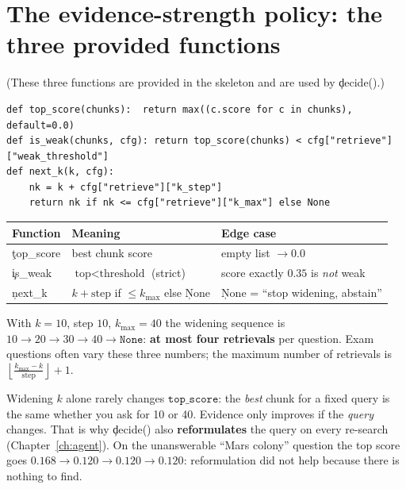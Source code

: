 \section{The evidence-strength policy: the three provided functions}
(These three functions are provided in the skeleton and are used by \c{decide()}.)
\begin{lstlisting}
def top_score(chunks):  return max((c.score for c in chunks), default=0.0)
def is_weak(chunks, cfg): return top_score(chunks) < cfg["retrieve"]["weak_threshold"]
def next_k(k, cfg):
    nk = k + cfg["retrieve"]["k_step"]
    return nk if nk <= cfg["retrieve"]["k_max"] else None
\end{lstlisting}
\begin{center}\begin{tabular}{@{}lll@{}}\toprule Function & Meaning & Edge case \\ \midrule
\c{top\_score} & best chunk score & empty list $\to 0.0$ \\
\c{is\_weak} & $\text{top}<\text{threshold}$ (strict) & score exactly $0.35$ is \emph{not} weak \\
\c{next\_k} & $k+\text{step}$ if $\le k_{\max}$ else \c{None} & \c{None} = ``stop widening, abstain'' \\
\bottomrule\end{tabular}\end{center}
\begin{keyidea}
With $k=10$, step $10$, $k_{\max}=40$ the widening sequence is $10\to20\to30\to40\to\texttt{None}$: \textbf{at most four retrievals} per question. Exam questions often vary these three numbers; the maximum number of retrievals is $\left\lfloor \frac{k_{\max}-k}{\text{step}}\right\rfloor+1$.
\end{keyidea}
\begin{gotcha}
Widening $k$ alone rarely changes $\texttt{top\_score}$: the \emph{best} chunk for a fixed query is the same whether you ask for 10 or 40. Evidence only improves if the \emph{query} changes. That is why \c{decide()} also \textbf{reformulates} the query on every re-search (Chapter~\ref{ch:agent}). On the unanswerable ``Mars colony'' question the top score goes $0.168\to0.120\to0.120\to0.120$: reformulation did not help because there is nothing to find.
\end{gotcha}

